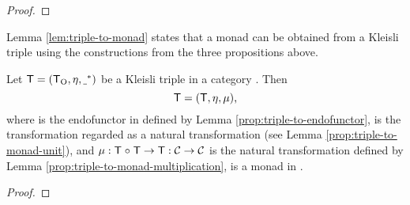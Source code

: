 \begin{proposition}
\begin{proof}
  \end{proof}

\end{proposition}

Lemma \ref{lem:triple-to-monad} states that a monad can be obtained
from a Kleisli triple using the constructions from the three propositions
above.

\begin{lemma}
  \label{lem:triple-to-monad}

  Let $\mathsf{T} = (\mathsf{T}_{\operatorname{O}}, \eta, \underline{~}^*)$ be a Kleisli triple in
  a category . Then
  \begin{equation*}
    \mathsf{T} = (\mathsf{T}, \eta, \mu)
    \text{,}
  \end{equation*}
  where  is the endofunctor in  defined by Lemma
  \ref{prop:triple-to-endofunctor}, \nat{\eta} is the transformation
  \nat{\eta} regarded as a natural transformation (see Lemma
  \ref{prop:triple-to-monad-unit}), and $\mu: \mathsf{T} \mathrel{\circ}
  \mathsf{T} \to \mathsf{T}: \mathcal{C} \to \mathcal{C}$ is the natural
  transformation defined by Lemma
  \ref{prop:triple-to-monad-multiplication}, is a monad in .

  \begin{proof}


\end{proof}
\end{lemma}
